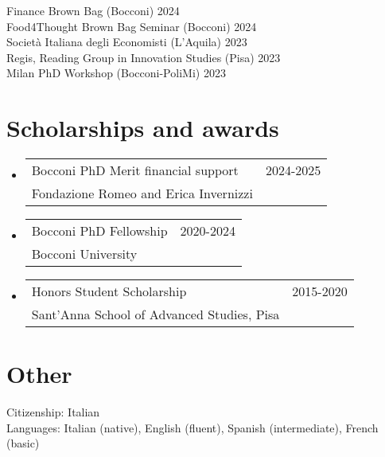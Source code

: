 \documentclass[A4,11pt]{article}
\makeatletter
\newcommand{\CVAw}[4]{
	\vspace{-2pt}\item
	\begin{tabular*}{0.97\textwidth}[t]{l@{\extracolsep{\fill}}r}
		#1 & #2 \\
		\small#3 & \small #4 \\
	\end{tabular*}\vspace{-7pt}
}
\newcommand{\CVSubHeadingListStart}{\begin{itemize}[leftmargin=0.5cm, label={}]}
\newcommand{\CVSubHeadingListEnd}{\end{itemize}}
\makeatother
\begin{document}
\smallskip
\hspace{12pt} Finance Brown Bag (Bocconi) \hfill 2024\\
\smallskip
\hspace{12pt} Food4Thought Brown Bag Seminar (Bocconi) \hfill 2024\\
\smallskip
\hspace{12pt} Società Italiana degli Economisti (L'Aquila) \hfill 2023\\
\smallskip
\hspace{12pt} Regis, Reading Group in Innovation Studies (Pisa) \hfill 2023\\
\smallskip
\hspace{12pt} Milan PhD Workshop (Bocconi-PoliMi) \hfill 2023\\

\vspace{1pt}

\section{Scholarships and awards}

\CVSubHeadingListStart
\CVAw{Bocconi PhD Merit financial support}{2024-2025}{Fondazione Romeo and Erica Invernizzi}{}
\CVAw{Bocconi PhD Fellowship}{2020-2024}{Bocconi University}{}
\CVAw{Honors Student Scholarship}{2015-2020}{Sant’Anna School of Advanced Studies, Pisa}{}

\CVSubHeadingListEnd


\vspace{1pt}

\section{Other}
\hspace{12pt} Citizenship: Italian\\
\smallskip
\hspace{12pt} Languages: Italian (native), English (fluent), Spanish (intermediate), French (basic)
    
\end{document}
